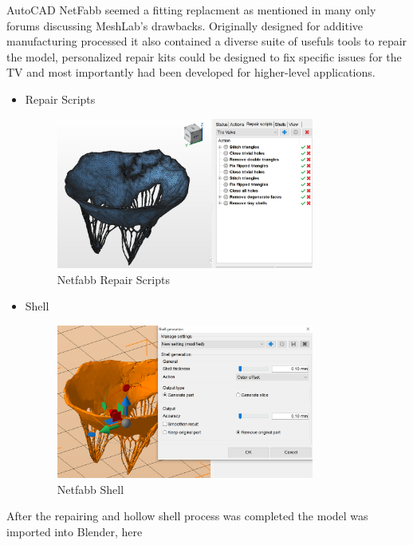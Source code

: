 AutoCAD NetFabb seemed a fitting replacment as mentioned in many only forums discussing MeshLab's drawbacks. Originally designed for additive manufacturing processed it also contained a diverse suite of usefuls tools to repair the model, personalized repair kits could be designed to fix specific issues for the \gls{TV} and most importantly had been developed for higher-level applications.
\begin{itemize}
  \item Repair Scripts
        \begin{figure}
          \centering
          \includegraphics[width=0.8\textwidth]{figures/NetFabbRepair.png}
          \caption{Netfabb Repair Scripts}
          \label{fig:NetfabbRepair}
        \end{figure}
  \item Shell
        \begin{figure}
          \centering
          \includegraphics[width=0.8\textwidth]{figures/NetFabbShell.png}
          \caption{Netfabb Shell}
          \label{fig:NetfabbShell}
        \end{figure}
\end{itemize}


After the repairing and hollow shell process was completed the model was imported into Blender, here


